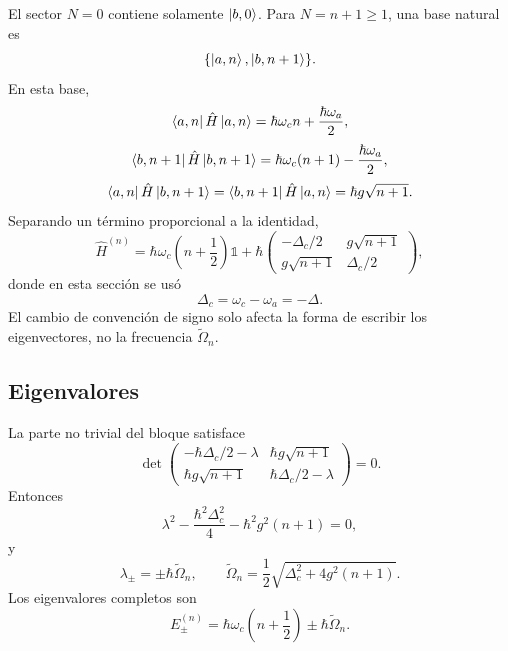 \documentclass[11pt]{article}
\newcommand{\Omn}{\tilde\Omega_n}
\begin{document}
El sector $N=0$ contiene solamente $\ket{b,0}$. Para $N=n+1\geq1$, una base
natural es
\begin{equation}
  \{\ket{a,n},\ket{b,n+1}\}.
\end{equation}
En esta base,
\begin{equation}
  \bra{a,n}\hat H\ket{a,n}
  =
  \hbar\omega_c n+\frac{\hbar\omega_a}{2},
\end{equation}
\begin{equation}
  \bra{b,n+1}\hat H\ket{b,n+1}
  =
  \hbar\omega_c(n+1)-\frac{\hbar\omega_a}{2},
\end{equation}
\begin{equation}
  \bra{a,n}\hat H\ket{b,n+1}
  =
  \bra{b,n+1}\hat H\ket{a,n}
  =
  \hbar g\sqrt{n+1}.
\end{equation}
Separando un t\'ermino proporcional a la identidad,
\begin{equation}
  \hat H^{(n)}
  =
  \hbar\omega_c\left(n+\frac{1}{2}\right)\mathds{1}
  +
  \hbar
  \begin{pmatrix}
    -\Delta_c/2 & g\sqrt{n+1}\\
    g\sqrt{n+1} & \Delta_c/2
  \end{pmatrix},
\end{equation}
donde en esta secci\'on se us\'o
\begin{equation}
  \Delta_c=\omega_c-\omega_a=-\Delta.
\end{equation}
El cambio de convenci\'on de signo solo afecta la forma de escribir los
eigenvectores, no la frecuencia $\Omn$.

\subsection{Eigenvalores}

La parte no trivial del bloque satisface
\begin{equation}
  \det
  \begin{pmatrix}
    -\hbar\Delta_c/2-\lambda & \hbar g\sqrt{n+1}\\
    \hbar g\sqrt{n+1} & \hbar\Delta_c/2-\lambda
  \end{pmatrix}
  =
  0.
\end{equation}
Entonces
\begin{equation}
  \lambda^2
  -
  \frac{\hbar^2\Delta_c^2}{4}
  -
  \hbar^2g^2(n+1)
  =
  0,
\end{equation}
y
\begin{equation}
  \lambda_\pm=\pm\hbar\Omn,
  \qquad
  \Omn=\frac{1}{2}\sqrt{\Delta_c^2+4g^2(n+1)}.
\end{equation}
Los eigenvalores completos son
\begin{equation}
  \boxed{
  E_\pm^{(n)}
  =
  \hbar\omega_c\left(n+\frac{1}{2}\right)
  \pm
  \hbar\Omn.
  }
\end{equation}
\end{document}
